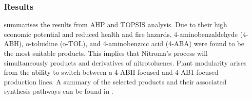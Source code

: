 


\subsubsection{Results}
 summarises the results from AHP and TOPSIS analysis.   
Due to their high economic potential and reduced health and fire hazards, 4-aminobenzaldehyde (4-ABH), o-toluidine (o-TOL), and 4-aminobenzoic acid (4-ABA) were found to be the most suitable products. This implies that Nitroma's process will simultaneously products \ortho and \para derivatives of nitrotoluenes. Plant modularity arises from the ability to switch between a 4-ABH focused and 4-AB1 focused production lines. A summary of the selected products and their associated synthesis pathways can be found in .

